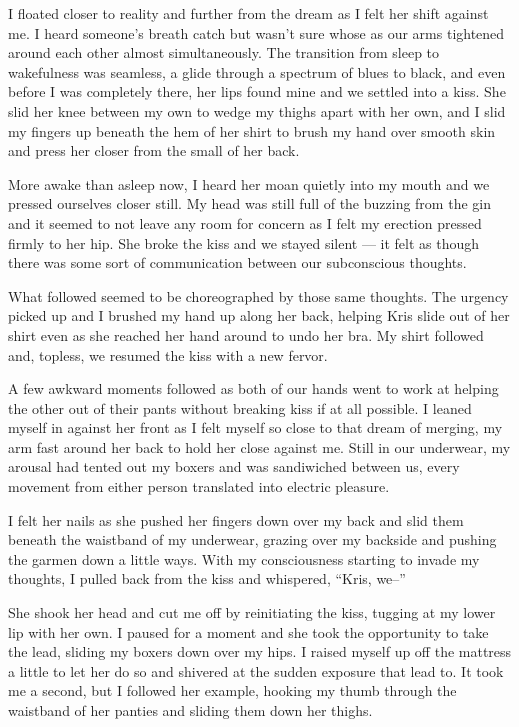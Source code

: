 I floated closer to reality and further from the dream as I felt her shift against me.  I heard someone's breath catch but wasn't sure whose as our arms tightened around each other almost simultaneously.  The transition from sleep to wakefulness was seamless, a glide through a spectrum of blues to black, and even before I was completely there, her lips found mine and we settled into a kiss.  She slid her knee between my own to wedge my thighs apart with her own, and I slid my fingers up beneath the hem of her shirt to brush my hand over smooth skin and press her closer from the small of her back.

More awake than asleep now, I heard her moan quietly into my mouth and we pressed ourselves closer still.  My head was still full of the buzzing from the gin and it seemed to not leave any room for concern as I felt my erection pressed firmly to her hip.  She broke the kiss and we stayed silent --- it felt as though there was some sort of communication between our subconscious thoughts.

What followed seemed to be choreographed by those same thoughts.  The urgency picked up and I brushed my hand up along her back, helping Kris slide out of her shirt even as she reached her hand around to undo her bra.  My shirt followed and, topless, we resumed the kiss with a new fervor.

A few awkward moments followed as both of our hands went to work at helping the other out of their pants without breaking kiss if at all possible.  I leaned myself in against her front as I felt myself so close to that dream of merging, my arm fast around her back to hold her close against me.  Still in our underwear, my arousal had tented out my boxers and was sandiwiched between us, every movement from either person translated into electric pleasure.

I felt her nails as she pushed her fingers down over my back and slid them beneath the waistband of my underwear, grazing over my backside and pushing the garmen down a little ways.  With my consciousness starting to invade my thoughts, I pulled back from the kiss and whispered, ``Kris, we--''

She shook her head and cut me off by reinitiating the kiss, tugging at my lower lip with her own.  I paused for a moment and she took the opportunity to take the lead, sliding my boxers down over my hips.  I raised myself up off the mattress a little to let her do so and shivered at the sudden exposure that lead to.  It took me a second, but I followed her example, hooking my thumb through the waistband of her panties and sliding them down her thighs.

